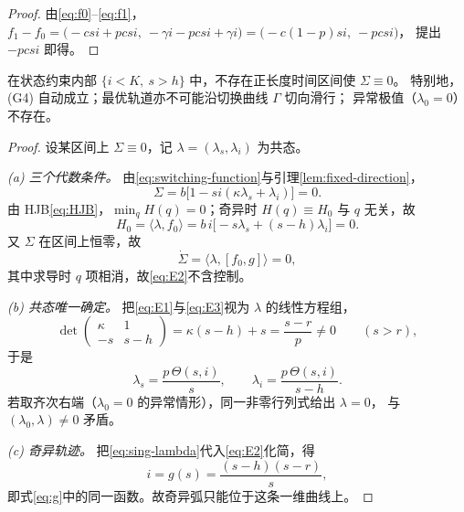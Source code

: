 \begin{proof}
由\eqref{eq:f0}--\eqref{eq:f1}，
$f_1-f_0=\bigl(-csi+pcsi,\ -\gamma i-pcsi+\gamma i\bigr)=\bigl(-c(1-p)si,\ -pcsi\bigr)$，
提出 $-pcsi$ 即得。
\end{proof}

\begin{theorem}[不存在正长度内部奇异弧]
\label{thm:no-singular}
在状态约束内部 $\{i<K,\ s>h\}$ 中，不存在正长度时间区间使 $\Sigma\equiv0$。
特别地，(G4) 自动成立；最优轨道亦不可能沿切换曲线 $\Gamma$ 切向滑行；
异常极值（$\lambda_0=0$）不存在。
\end{theorem}

\begin{proof}
设某区间上 $\Sigma\equiv0$，记 $\lambda=(\lambda_s,\lambda_i)$ 为共态。

\emph{(a) 三个代数条件。} 由\eqref{eq:switching-function}与引理\ref{lem:fixed-direction}，
\begin{equation}
\Sigma=b\bigl[1-si(\kappa\lambda_s+\lambda_i)\bigr]=0 .
\label{eq:E1}
\end{equation}
由 HJB\eqref{eq:HJB}，$\min_qH(q)=0$；奇异时 $H(q)\equiv H_0$ 与 $q$ 无关，故
\begin{equation}
H_0=\langle\lambda,f_0\rangle=b\,i\bigl[-s\lambda_s+(s-h)\lambda_i\bigr]=0 .
\label{eq:E3}
\end{equation}
又 $\Sigma$ 在区间上恒零，故
\begin{equation}
\dot\Sigma=\bigl\langle\lambda,[f_0,g]\bigr\rangle=0,
\label{eq:E2}
\end{equation}
其中求导时 $q$ 项相消，故\eqref{eq:E2}不含控制。

\emph{(b) 共态唯一确定。} 把\eqref{eq:E1}与\eqref{eq:E3}视为 $\lambda$ 的线性方程组，
\[
\det\begin{pmatrix}\kappa&1\\-s&s-h\end{pmatrix}=\kappa(s-h)+s=\frac{s-r}{p}\ne0
\qquad(s>r),
\]
于是
\begin{equation}
\lambda_s=\frac{p\,\Theta(s,i)}{s},\qquad \lambda_i=\frac{p\,\Theta(s,i)}{s-h}.
\label{eq:sing-lambda}
\end{equation}
若取齐次右端（$\lambda_0=0$ 的异常情形），同一非零行列式给出 $\lambda=0$，
与 $(\lambda_0,\lambda)\ne0$ 矛盾。

\emph{(c) 奇异轨迹。} 把\eqref{eq:sing-lambda}代入\eqref{eq:E2}化简，得
\begin{equation}
i=g(s)=\frac{(s-h)(s-r)}{s},
\label{eq:singular-locus}
\end{equation}
即式\eqref{eq:g}中的同一函数。故奇异弧只能位于这条一维曲线上。


\end{proof}
